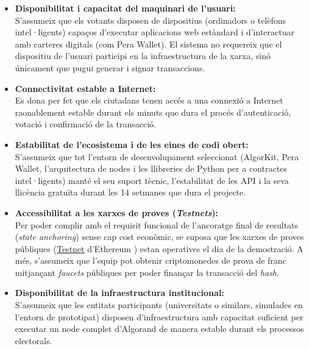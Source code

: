 \begin{itemize}
    \item \textbf{Disponibilitat i capacitat del maquinari de l'usuari:} \\
    S'assumeix que els votants disposen de dispositius (ordinadors o telèfons intel·ligents) capaços d'executar aplicacions web estàndard i d'interactuar amb carteres digitals (com Pera Wallet). El sistema no requereix que el dispositiu de l'usuari participi en la infraestructura de la xarxa, sinó únicament que pugui generar i signar transaccions.
    
    \item \textbf{Connectivitat estable a Internet:} \\
    Es dona per fet que els ciutadans tenen accés a una connexió a Internet raonablement estable durant els minuts que dura el procés d'autenticació, votació i confirmació de la transacció.
    
    \item \textbf{Estabilitat de l'ecosistema i de les eines de codi obert:} \\
    S'assumeix que tot l'entorn de desenvolupament seleccionat (AlgorKit, Pera Wallet, l'arquitectura de nodes i les llibreries de Python per a contractes intel·ligents) manté el seu suport tècnic, l'estabilitat de les API i la seva llicència gratuïta durant les 14 setmanes que dura el projecte.
    
    \item \textbf{Accessibilitat a les xarxes de proves (\textit{Testnets}):} \\
    Per poder complir amb el requisit funcional de l'ancoratge final de resultats (\textit{state anchoring}) sense cap cost econòmic, se suposa que les xarxes de proves públiques (\hyperlink{def:testnet}{Testnet} d'Ethereum \cite{sepolia}) estan operatives el dia de la demostració. A més, s'assumeix que l'equip pot obtenir criptomonedes de prova de franc mitjançant \textit{faucets} públiques per poder finançar la transacció del \textit{hash}.

    \item \textbf{Disponibilitat de la infraestructura institucional:} \\
    S'assumeix que les entitats participants (universitats o similars, simulades en l'entorn de prototipat) disposen d'infraestructura amb capacitat suficient per executar un node complet d'Algorand de manera estable durant els processos electorals.
\end{itemize}

